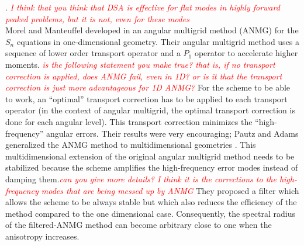 \documentclass[preprint,10pt]{elsarticle}
\renewcommand{\(}{\left(}
\renewcommand{\)}{\right)}
\renewcommand{\[}{\left[}
\renewcommand{\]}{\right]}
\newcommand{\tri}[1]{\textcolor{red}{{\it #1}}}
\begin{document}
\cite{multigrid_1d,multigrid_2d}. \tri{I think that you think that DSA is effective for flat modes in highly forward peaked problems, but it is not, even for these modes}\\
Morel and Manteuffel developed in \cite{multigrid_1d} an angular multigrid
method (ANMG) for the $S_n$ equations in one-dimensional geometry. Their angular
multigrid method uses a sequence of lower order transport operator and a
$P_1$ operator to accelerate higher moments. \tri{is the following statement you make true? that is, if no transport correction is applied, does ANMG fail, even in 1D? or is it that the transport correction is just more advantageous for 1D ANMG?} For the scheme to be able to
work, an ``optimal'' transport correction has to be applied to each transport
operator (in the context of angular multigrid, the optimal transport correction is done for each angular level). 
This transport correction minimizes the ``high-frequency'' angular
errors. Their results were very encouraging; Pautz and Adams generalized the ANMG method 
to multidimensional geometries \cite{multigrid_2d}. This multidimensional
extension of the original angular multigrid method needs to be stabilized
because the scheme amplifies the high-frequency error modes
instead of damping them.\tri{can you give more details? I think it is the corrections to the high-frequency modes that are being messed up by ANMG}  
They proposed a 
filter which allows the scheme to be always stable but which also reduces the 
efficiency of the method compared to the one dimensional case. Consequently, the spectral 
radius of the filtered-ANMG method can become arbitrary close to one when the anisotropy increases.\\
\end{document}
